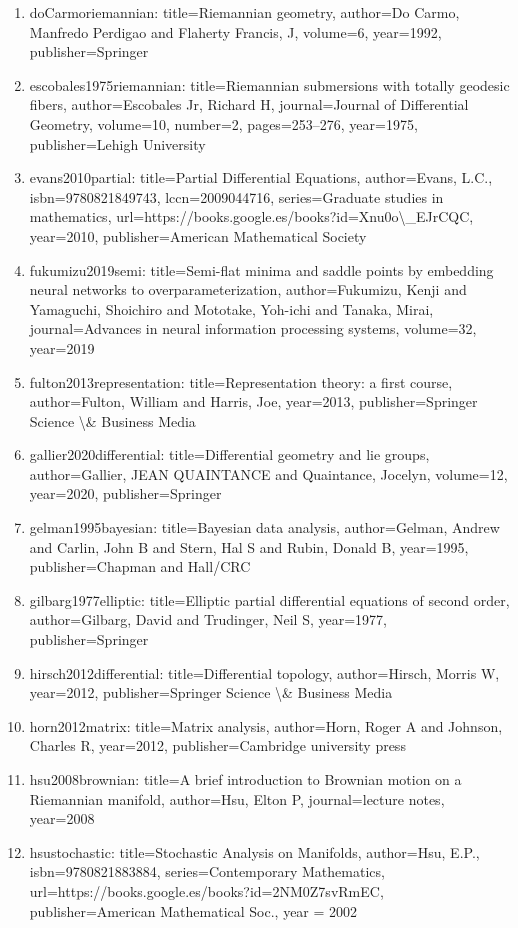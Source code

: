 \documentclass[11pt]{article}
\begin{document}
\begin{enumerate}[leftmargin=*]
  \item doCarmoriemannian: title=Riemannian geometry, author=Do Carmo, Manfredo Perdigao and Flaherty Francis, J, volume=6, year=1992, publisher=Springer
  \item escobales1975riemannian: title=Riemannian submersions with totally geodesic fibers, author=Escobales Jr, Richard H, journal=Journal of Differential Geometry, volume=10, number=2, pages=253--276, year=1975, publisher=Lehigh University
  \item evans2010partial: title=Partial Differential Equations, author=Evans, L.C., isbn=9780821849743, lccn=2009044716, series=Graduate studies in mathematics, url=https://books.google.es/books?id=Xnu0o\textbackslash{}\_EJrCQC, year=2010, publisher=American Mathematical Society
  \item fukumizu2019semi: title=Semi-flat minima and saddle points by embedding neural networks to overparameterization, author=Fukumizu, Kenji and Yamaguchi, Shoichiro and Mototake, Yoh-ichi and Tanaka, Mirai, journal=Advances in neural information processing systems, volume=32, year=2019
  \item fulton2013representation: title=Representation theory: a first course, author=Fulton, William and Harris, Joe, year=2013, publisher=Springer Science \textbackslash{}\& Business Media
  \item gallier2020differential: title=Differential geometry and lie groups, author=Gallier, JEAN QUAINTANCE and Quaintance, Jocelyn, volume=12, year=2020, publisher=Springer
  \item gelman1995bayesian: title=Bayesian data analysis, author=Gelman, Andrew and Carlin, John B and Stern, Hal S and Rubin, Donald B, year=1995, publisher=Chapman and Hall/CRC
  \item gilbarg1977elliptic: title=Elliptic partial differential equations of second order, author=Gilbarg, David and Trudinger, Neil S, year=1977, publisher=Springer
  \item hirsch2012differential: title=Differential topology, author=Hirsch, Morris W, year=2012, publisher=Springer Science \textbackslash{}\& Business Media
  \item horn2012matrix: title=Matrix analysis, author=Horn, Roger A and Johnson, Charles R, year=2012, publisher=Cambridge university press
  \item hsu2008brownian: title=A brief introduction to Brownian motion on a Riemannian manifold, author=Hsu, Elton P, journal=lecture notes, year=2008
  \item hsustochastic: title=Stochastic Analysis on Manifolds, author=Hsu, E.P., isbn=9780821883884, series=Contemporary Mathematics, url=https://books.google.es/books?id=2NM0Z7svRmEC, publisher=American Mathematical Soc., year = 2002

\end{enumerate}
\end{document}
